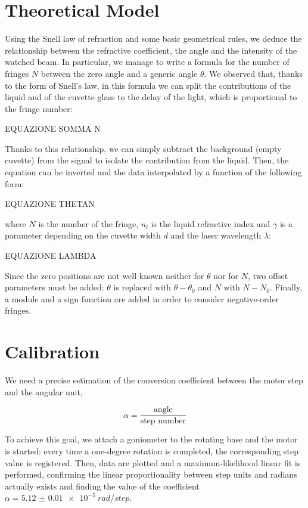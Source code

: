 \documentclass[a4paper, 12pt]{article}
\begin{document}
\section{Theoretical Model}

Using the Snell law of refraction and some basic geometrical rules, we deduce the relationship between the refractive coefficient, the angle and the intensity of the watched beam. In particular, we manage to write a formula for the number of fringes \(N\) between the zero angle and a generic angle \(\theta\). We observed that, thanks to the form of Snell’s law, in this formula we can split the contributions of the liquid and of the cuvette glass to the delay of the light, which is proportional to the fringe number:

EQUAZIONE SOMMA N

Thanks to this relationship, we can simply subtract the background (empty cuvette) from the signal to isolate the contribution from the liquid. Then, the equation can be inverted and the data interpolated by a function of the following form:

EQUAZIONE THETAN

where \(N\) is the number of the fringe, \(n_l\) is the liquid refractive index and \(\gamma\) is a parameter depending on the cuvette width \(d\) and the laser wavelength \(\lambda\):

EQUAZIONE LAMBDA

Since the zero positions are not well known neither for \(\theta\) nor for \(N\), two offset parameters must be added: \(\theta\) is replaced with \(\theta - \theta_0\) and \(N\) with \(N-N_0\). Finally, a module and a sign function are added in order to consider negative-order fringes.

\section{Calibration}


We need a precise estimation of the conversion coefficient between the motor step and the angular unit,

\begin{equation}
  \alpha = \frac{\text{angle}}{\text{step number}}
\end{equation}

To achieve this goal, we attach a goniometer to the rotating base and the motor is started: every time a one-degree rotation is completed, the corresponding step value is registered. Then, data are plotted and a maximum-likelihood linear fit is performed, confirming the linear proportionality between step units and radians actually exists and finding the value of the coefficient \( \alpha =  \SI{5.12(1)e-5}{rad/step}\).
\end{document}
